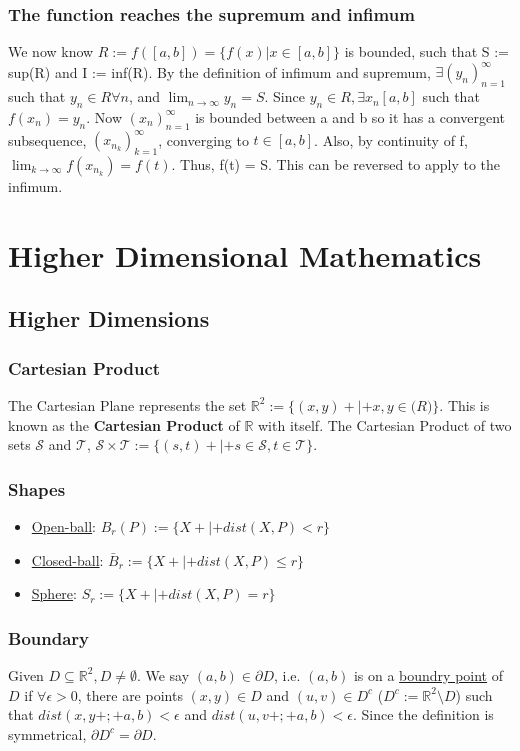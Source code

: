 \documentclass[11 pt, twoside]{article}
\begin{document}
\subsubsection{The function reaches the supremum and infimum}
We now know $R := f([a, b]) = \{f(x) | x \in [a, b]\}$ is bounded, such that S := sup(R) and I := inf(R). By the definition of infimum and supremum, $\exists (y_n)^\infty_{n = 1}$ such that $y_n \in R  \forall n$, and $\lim_{n \to \infty}y_n = S$. Since $y_n \in R, \exists x_n [a, b]$ such that $f(x_n) = y_n$. Now $(x_n)^\infty_{n=1}$ is bounded between a and b so it has a convergent subsequence, $(x_{n_k})^\infty_{k=1}$, converging to $t \in [a, b]$. Also, by continuity of f, $\lim_{k \to \infty}f(x_{n_k}) = f(t)$. Thus, f(t) = S. This can be reversed to apply to the infimum.

\section{Higher Dimensional Mathematics}

\subsection{Higher Dimensions}
\subsubsection{Cartesian Product}
The Cartesian Plane represents the set $\mathbb{R}^2 := \{(x, y)+|+x, y\in \mathbb(R)\}$. This is known as the \textbf{Cartesian Product} of $\mathbb{R}$ with
itself. The Cartesian Product of two sets $\mathcal{S}$ and $\mathcal{T}$,
$\mathcal{S} \times \mathcal{T} :=  \{(s, t)+|+s\in\mathcal{S},
t\in\mathcal{T}\}$.

\subsubsection{Shapes}
\begin{itemize}
\item \underline{Open-ball}:
$B_r(P) := \{X+|+dist(X, P) < r\}$
\item \underline{Closed-ball}:
$\bar{B}_r := \{X+|+ dist(X, P) \leq r\}$
\item \underline{Sphere}:
$S_r := \{X+|+dist(X, P) = r\}$
\end{itemize}

\subsubsection{Boundary}
Given $D \subseteq \mathbb{R}^2, D \neq \emptyset$. We say $(a, b) \in
\partial D$, i.e. $(a, b)$ is on a \underline{boundry point} of $D$ if $\forall
\epsilon > 0$, there are points $(x, y)\in D$ and $(u, v) \in D^c$ ($D^c :=
\mathbb{R}^2 \setminus D$) such that $dist(x, y+;+ a, b) < \epsilon$ and
$dist(u, v+;+ a, b) < \epsilon$. Since the definition is symmetrical, $\partial D^c = \partial D$.
\end{document}
